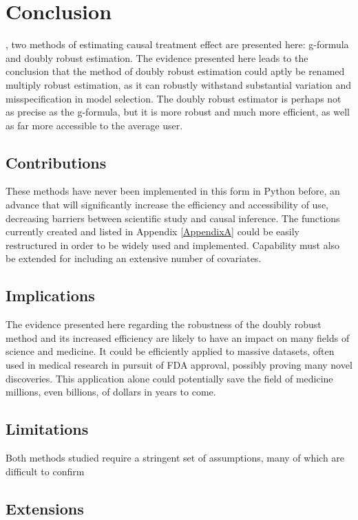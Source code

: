 \chapter{Conclusion}
\label{conclusion}


, two methods of estimating causal treatment effect are presented here: g-formula and doubly robust estimation.  The evidence presented here leads to the conclusion that the method of doubly robust estimation could aptly be renamed multiply robust estimation, as it can robustly withstand substantial variation and misspecification in model selection.  The doubly robust estimator is perhaps not as precise as the g-formula, but it is more robust and much more efficient, as well as far more accessible to the average user. 


\section{Contributions}
These methods have never been implemented in this form in Python before, an advance that will significantly increase the efficiency and accessibility of use, decreasing barriers between scientific study and causal inference.  The functions currently created and listed in Appendix \ref{AppendixA} could be easily restructured in order to be widely used and implemented.  Capability must also be extended for including an extensive number of covariates.  


\section{Implications}
The evidence presented here regarding the robustness of the doubly robust method and its increased efficiency are likely to have an impact on many fields of science and medicine.  It could be efficiently applied to massive datasets, often used in medical research in pursuit of FDA approval, possibly proving many novel discoveries.  This application alone could potentially save the field of medicine millions, even billions, of dollars in years to come.   

\section{Limitations}
Both methods studied require a stringent set of assumptions, many of which are difficult to confirm

\section{Extensions} 